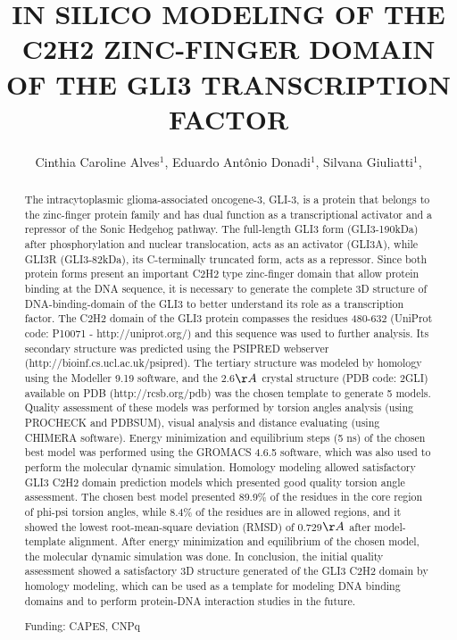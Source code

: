 \documentclass[twoside]{article}
\title{\vspace{-15mm}\fontsize{24pt}{10pt}\selectfont\textbf{ IN SILICO MODELING OF THE C2H2 ZINC-FINGER DOMAIN OF THE GLI3 TRANSCRIPTION FACTOR }} %
\author{ Cinthia Caroline Alves$^{1}$, Eduardo Antônio Donadi$^{1}$, Silvana Giuliatti$^{1}$, }
\affil{ 1 Ribeirão Preto Medical School, University of São Paulo

 }
\date{}
\begin{document}
  
  
  \maketitle %
  
  
  \thispagestyle{fancy} %
  
  
  \begin{abstract}
  The intracytoplasmic glioma-associated oncogene-3, GLI-3, is a protein that belongs to the zinc-finger protein family and has dual function as a transcriptional activator and a repressor of the Sonic Hedgehog pathway. The full-length GLI3 form (GLI3-190kDa) after phosphorylation and nuclear translocation, acts as an activator (GLI3A), while GLI3R (GLI3-82kDa), its C-terminally truncated form, acts as a repressor. Since both protein forms present an important C2H2 type zinc-finger domain that allow protein binding at the DNA sequence, it is necessary to generate the complete 3D structure of DNA-binding-domain of the GLI3 to better understand its role as a transcription factor. The C2H2 domain of the GLI3 protein compasses the residues 480-632 (UniProt code: P10071 - http://uniprot.org/) and this sequence was used to further analysis. Its secondary structure was predicted using the PSIPRED webserver (http://bioinf.cs.ucl.ac.uk/psipred). The tertiary structure was modeled by homology using the Modeller 9.19 software, and the 2.6$\AA$ crystal structure (PDB code: 2GLI) available on PDB (http://rcsb.org/pdb) was the chosen template to generate 5 models. Quality assessment of these models was performed by torsion angles analysis (using PROCHECK and PDBSUM), visual analysis and distance evaluating (using CHIMERA software). Energy minimization and equilibrium steps (5 ns) of the chosen best model was performed using the GROMACS 4.6.5 software, which was also used to perform the molecular dynamic simulation. Homology modeling allowed satisfactory GLI3 C2H2 domain prediction models which presented good quality torsion angle assessment. The chosen best model presented 89.9\% of the residues in the core region of phi-psi torsion angles, while 8.4\% of the residues are in allowed regions, and it showed the lowest root-mean-square deviation (RMSD) of 0.729$\AA$ after model-template alignment. After energy minimization and equilibrium of the chosen model, the molecular dynamic simulation was done. In conclusion, the initial quality assessment showed a satisfactory 3D structure generated of the GLI3 C2H2 domain by homology modeling, which can be used as a template for modeling DNA binding domains and to perform protein-DNA interaction studies in the future.
  
  Funding: CAPES, CNPq \\ 
  \end{abstract}
  
\end{document}
